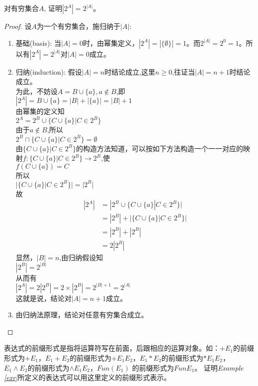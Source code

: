 \begin{example}
对有穷集合$A$, 证明$|2^A| = 2^{|A|}$。
\begin{proof}
	设$A$为一个有穷集合，施归纳于$|A|$:
	\begin{enumerate}
		\item 基础(basis): 当$|A|=0$时，由幂集定义，$|2^A|=|\{\emptyset \}|=1$。而$2^{|A|}=2^0=1$。所以有$|2^A|=2^{|A|}$对$|A|=0$成立。
		\item 归纳(induction): 假设$|A|=n$时结论成立,这里$n\ge 0$,往证当$|A|=n+1$时结论成立。\\
		为此，不妨设$A=B\cup \{a\},a\notin B$,即\\
		$|2^A|=B\cup \{a\}=|B|+|\{a\}|=|B|+1$\\
		由幂集的定义知\\
		$2^A = 2^B \cup \{C\cup \{ a\} | C\in 2^B\}$\\
		由于$a\notin B$,所以\\
		$2^B\cap \{C\cup \{a\}|C\in 2^B \} = \emptyset$\\
		由$\{C\cup \{a\}|C\in 2^B \}$的构造方法知道，可以按如下方法构造一个一一对应的映射$f:\{C\cup \{a\}|C\in 2^B \}\to 2^B$,使\\
		$f(C\cup\{a\})=C$\\
		所以\\
		$|\{C\cup \{a\}|C\in 2^B \}|=|2^B|$\\
		故
		\begin{align*}
			|2^A|&=|2^B \cup \{C\cup \{ a\} | C\in 2^B\}|\\
			&=|2^B|+|\{C\cup \{a\}|C\in 2^B \}| \\
			&=|2^B|+|2^B| \\
			&=2|2^B| 
	    \end{align*}
		显然，$|B|=n$,由归纳假设知\\
		$|2^B|=2^{|B|}$\\
		从而有\\
		$|2^A|=2|2^B|=2\times|2^B|=2^{|B|+1}=2^{|A|}$\\
		这就是说，结论对$|A|=n+1$成立。
		\item 由归纳法原理，结论对任意有穷集合成立。
	\end{enumerate}
\end{proof}	
\end{example}

\begin{example}
	表达式的前缀形式是指将运算符写在前面，后跟相应的运算对象。如：$+E_1$的前缀形式为$+E_1$，$E_1+E_2$的前缀形式为$+E_1E_2$，$E_1\ast E_2$的前缀形式为$\ast E_1E_2$， $E_1\land E_2$的前缀形式为$\land E_1E_2$，$Fun(E_1)$ 的前缀形式为$FunE_1$。
	证明\textit{Example \ref{exr}}所定义的表达式可以用这里定义的前缀形式表示。 	
\end{example}

